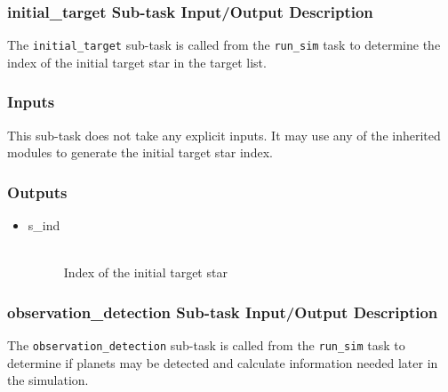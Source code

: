 \documentclass[cleanfoot]{asme2ej}
\begin{document}
\subsubsection{initial\_target Sub-task Input/Output Description} \label{sec:initialtargettask}
The \verb+initial_target+ sub-task is called from the \verb+run_sim+ task to determine the index of the initial target star in the target list.

\subsubsection*{Inputs}
This sub-task does not take any explicit inputs.  It may use any of the inherited modules to generate the initial target star index.

\subsubsection*{Outputs}
\begin{itemize}
    \item 
    \begin{description}
        \item[s\_ind] \hfill \\
        Index of the initial target star
    \end{description}
\end{itemize}

\subsubsection{observation\_detection Sub-task Input/Output Description} \label{sec:observationdetectiontask}
The \verb+observation_detection+ sub-task is called from the \verb+run_sim+ task to determine if planets may be detected and calculate information needed later in the simulation.
\end{document}
